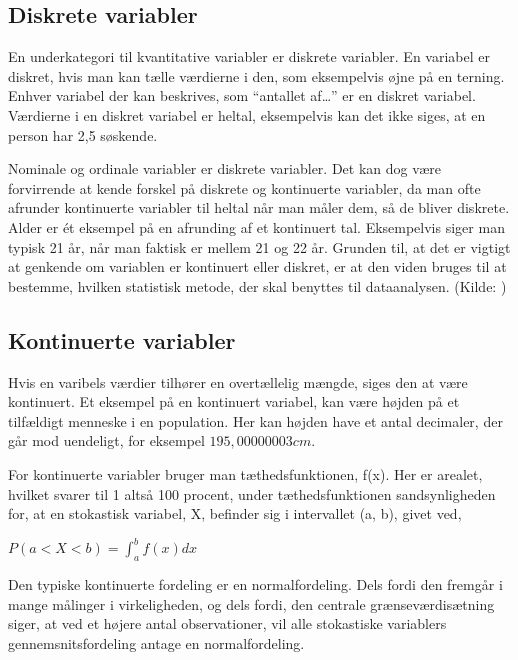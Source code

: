 \documentclass[]{book}
\theoremstyle{definition}
\theoremstyle{definition}
\theoremstyle{definition}
\theoremstyle{remark}
\begin{document}
\hypertarget{diskrete-variabler}{%
\subsection{Diskrete variabler}\label{diskrete-variabler}}

En underkategori til kvantitative variabler er diskrete variabler. En variabel er diskret, hvis man kan tælle værdierne i den, som eksempelvis øjne på en terning. Enhver variabel der kan beskrives, som ``antallet af\ldots{}'' er en diskret variabel. Værdierne i en diskret variabel er heltal, eksempelvis kan det ikke siges, at en person har 2,5 søskende.

Nominale og ordinale variabler er diskrete variabler. Det kan dog være forvirrende at kende forskel på diskrete og kontinuerte variabler, da man ofte afrunder kontinuerte variabler til heltal når man måler dem, så de bliver diskrete. Alder er ét eksempel på en afrunding af et kontinuert tal. Eksempelvis siger man typisk 21 år, når man faktisk er mellem 21 og 22 år. Grunden til, at det er vigtigt at genkende om variablen er kontinuert eller diskret, er at den viden bruges til at bestemme, hvilken statistisk metode, der skal benyttes til dataanalysen. (Kilde: \citep{ASTAbog})

\hypertarget{kontinuerte-variabler}{%
\subsection{Kontinuerte variabler}\label{kontinuerte-variabler}}

Hvis en varibels værdier tilhører en overtællelig mængde, siges den at være kontinuert. Et eksempel på en kontinuert variabel, kan være højden på et tilfældigt menneske i en population. Her kan højden have et antal decimaler, der går mod uendeligt, for eksempel \(195,00000003 cm\).

For kontinuerte variabler bruger man tæthedsfunktionen, f(x). Her er arealet, hvilket svarer til 1 altså 100 procent, under tæthedsfunktionen sandsynligheden for, at en stokastisk variabel, X, befinder sig i intervallet (a, b), givet ved,

\(P(a < X < b) = \int_a^b f(x) dx\)

Den typiske kontinuerte fordeling er en normalfordeling. Dels fordi den fremgår i mange målinger i virkeligheden, og dels fordi, den centrale grænseværdisætning siger, at ved et højere antal observationer, vil alle stokastiske variablers gennemsnitsfordeling antage en normalfordeling.
\end{document}
